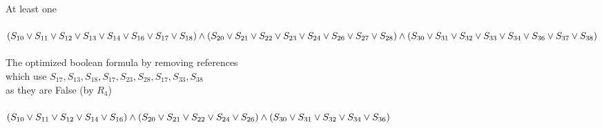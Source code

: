 \documentclass[a4paper, 14pt]{amsart}
\begin{document}
At least one
\\
\\
$
(S_{10} \vee S_{11} \vee S_{12} \vee S_{13} \vee S_{14} \vee S_{16} \vee S_{17} \vee S_{18}) \wedge
\\
(S_{20} \vee S_{21} \vee S_{22} \vee S_{23} \vee S_{24} \vee S_{26} \vee S_{27} \vee S_{28}) \wedge
\\
(S_{30} \vee S_{31} \vee S_{32} \vee S_{33} \vee S_{34} \vee S_{36} \vee S_{37} \vee S_{38})
$
\\
\\
The optimized boolean formula by removing references
\\
which use $S_{17}, S_{13}, S_{18}, S_{17}, S_{23}, S_{28}, S_{17}, S_{33}, S_{38}$ 
\\
as they are False (by $R_4$)
\\
\\
$
(S_{10} \vee S_{11} \vee S_{12} \vee S_{14} \vee S_{16}) \wedge
\\
(S_{20} \vee S_{21} \vee S_{22} \vee S_{24} \vee S_{26}) \wedge
\\
(S_{30} \vee S_{31} \vee S_{32} \vee S_{34} \vee S_{36})
$
\end{document}

